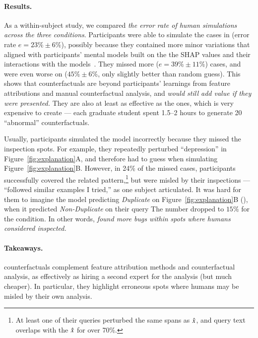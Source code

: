 \paragraph{Results.}
As a within-subject study, we compared \emph{the error rate of human simulations across the three conditions}.
Participants were able to simulate the cases in \crandom (error rate $e=23\%\pm6\%$), possibly because they contained more minor variations that aligned with participants' mental models built on the the SHAP values and their interactions with the models~\cite{miller}.
They missed more \chuman ($e=39\%\pm11\%$) cases, and were even worse on \cshap ($45\%\pm 6\%$, only slightly better than random guess).%
This shows that \cshap counterfactuals are beyond participants' learnings from feature attributions and manual counterfactual analysis, and \emph{would still add value if they were presented.}
They are also at least as effective as the \chuman ones, which is very expensive to create --- each graduate student spent 1.5--2 hours to generate 20 ``abnormal'' counterfactuals.

Usually, participants simulated the model incorrectly because they missed the inspection spots.
For example, they repeatedly perturbed ``depression'' in Figure~\ref{fig:explanation}A, and therefore had to guess when simulating Figure~\ref{fig:explanation}B.
However, in 24\% of the missed \cshap cases, participants successfully covered the related pattern,\footnote{At least one of their queries perturbed the same spans as $\hat{x}$, and query text overlaps with the $\hat{x}$ for over 70\%.} but were misled by their inspections --- ``followed similar examples I tried,'' as one subject articulated.
It was hard for them to imagine the model predicting \emph{Duplicate} on Figure~\ref{fig:explanation}B (), when it predicted \emph{Non-Duplicate} on their query 
The number dropped to $15\%$ for the \chuman condition.
In other words, \emph{\cshap found more bugs within spots where humans considered inspected.}


\paragraph{Takeaways.}
\sysname counterfactuals complement feature attribution methods and counterfactual analysis, as effectively as hiring a second expert for the analysis (but much cheaper).
In particular, they highlight erroneous spots where humans may be misled by their own analysis.

